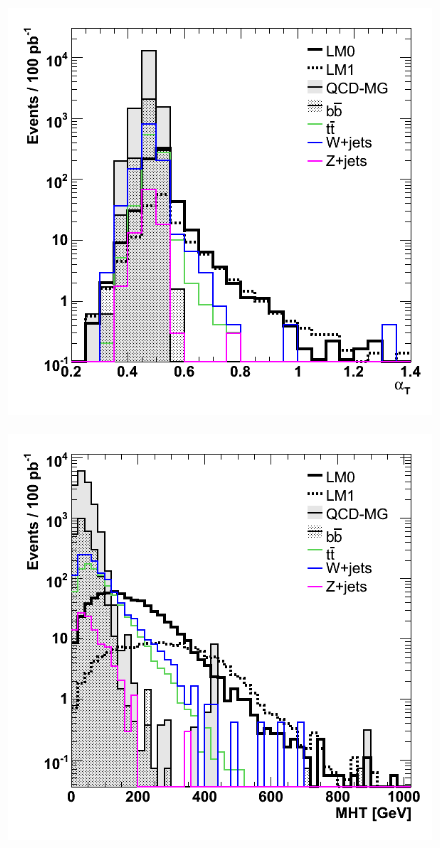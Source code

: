 \begin{figure}[h!]
\begin{minipage}[b]{0.5\linewidth}
\centering
{\label{fig:aT}\includegraphics[scale=0.38]{./plots/aT-AllSignals.png}} 
\end{minipage}
\begin{minipage}[b]{0.5\linewidth}
\centering
{\label{fig:mht}\includegraphics[scale=0.38]{./plots/MHT-AllSignals.png}} 

\end{minipage}
\end{figure}
